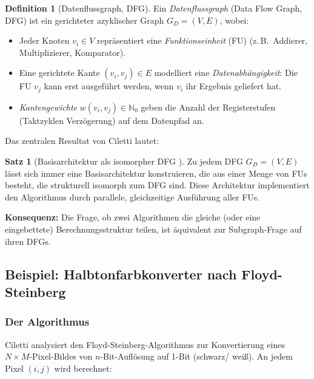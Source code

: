 ﻿\documentclass[a4paper,12pt]{article}
\theoremstyle{definition}
\newtheorem{definition}{Definition}
\newtheorem{satz}{Satz}
\begin{document}
\begin{definition}[Datenflussgraph, DFG]\label{def:dfg}
  Ein \emph{Datenflussgraph} (Data Flow Graph, DFG) ist ein gerichteter azyklischer
  Graph $G_D = (V, E)$, wobei:
  \begin{itemize}
    \item Jeder Knoten $v_i \in V$ repr\"asentiert eine \emph{Funktionseinheit} (FU)
          (z.\,B.\ Addierer, Multiplizierer, Komparator).
    \item Eine gerichtete Kante $(v_i, v_j) \in E$ modelliert eine
          \emph{Datenabh\"angigkeit}: Die FU $v_j$ kann erst ausgeführt werden, wenn
          $v_i$ ihr Ergebnis geliefert hat.
    \item \emph{Kantengewichte} $w(v_i, v_j) \in \mathbb{N}_0$ geben die Anzahl der
          Registerstufen (Taktzyklen Verzögerung) auf dem Datenpfad an.
  \end{itemize}
\end{definition}

Das zentralen Resultat von Ciletti \cite[S.~549]{ciletti2011} lautet:

\begin{satz}[Basisarchitektur als isomorpher DFG {\cite{ciletti2011}}]\label{satz:basisarch}
  Zu jedem DFG $G_D = (V, E)$ lässt sich immer eine Basisarchitektur konstruieren, die
  aus einer Menge von FUs besteht, die strukturell isomorph zum DFG sind. Diese
  Architektur implementiert den Algorithmus durch parallele, gleichzeitige Ausführung
  aller FUs.
\end{satz}

\textbf{Konsequenz:} Die Frage, ob zwei Algorithmen die gleiche (oder eine eingebettete)
Berechnungsstruktur teilen, ist äquivalent zur Subgraph-Frage auf ihren DFGs.

\subsection{Beispiel: Halbtonfarbkonverter nach Floyd-Steinberg}

\subsubsection{Der Algorithmus}

Ciletti \cite[S.~551--560]{ciletti2011} analysiert den Floyd-Steinberg-Algorithmus zur
Konvertierung eines $N \times M$-Pixel-Bildes von $n$-Bit-Auflösung auf 1-Bit (schwarz/
weiß). An jedem Pixel $(i, j)$ wird berechnet:
\end{document}
